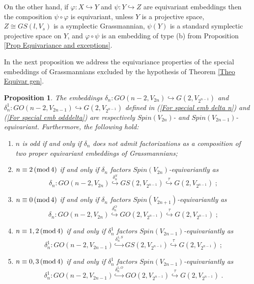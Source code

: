 \documentclass[12pt]{amsart}
\def\hw  {\hookrightarrow}
\newtheorem{prop}[theorem]{Proposition}
\begin{document}
On the other hand, if $\varphi:X\hookrightarrow Y$ and $\psi:Y \hookrightarrow Z$ are equivariant embeddings then the composition $\psi\circ \varphi$ is equivariant, unless $Y$ is a projective space, $Z\cong GS(l,V_s)$ is a symplectic Grassmannian, $\psi(Y)$ is a standard symplectic projective space on $Y$, and $\varphi\circ \psi$ is an embedding of type (b) from Proposition \ref{Prop Equivariance and exceptions}.

In the next proposition we address the equivariance properties of the special embeddings of Grassmannians excluded by the hypothesis of Theorem \ref{Theo Equivar gen}.

\begin{prop}\label{Prop special emb delta 4k2 S 4k O}
The embeddings $\delta_n:GO(n-2,V_{2n})\hw G(2,V_{2^{n-1}})$ and $\delta^1_n:GO(n-2,V_{2n-1})\hw G(2,V_{2^{n-1}})$ defined in (\ref{For special emb delta n}) and (\ref{For special emb odddelta}) are respectively $Spin(V_{2n})$- and $Spin(V_{2n-1})$-equivariant. Furthermore, the following hold:
\begin{enumerate}
\item[{\rm (i)}] $n$ is odd if and only if $\delta_n$ does not admit factorizations as a composition of two proper equivariant embeddings of Grassmannians;
\item[{\rm (ii)}] $n\equiv 2\,({\rm mod}\, 4)$ if and only if $\delta_n$ factors $Spin(V_{2n})$-equivariantly as
$$
\delta_n:GO(n-2,V_{2n})\stackrel{\delta_n^S}{\hw} GS(2,V_{2^{n-1}})\stackrel{\tau}{\hookrightarrow} G(2,V_{2^{n-1}})\;;
$$
\item[{\rm (iii)}] $n\equiv 0\,({\rm mod}\, 4)$ if and only if $\delta_n$ factors $Spin(V_{2n+1})$-equivariantly as
$$
\delta_n:GO(n-2,V_{2n})\stackrel{\delta_n^O}{\hw} GO(2,V_{2^{n-1}})\stackrel{\tau}{\hookrightarrow} G(2,V_{2^{n-1}})\;;
$$
\item[{\rm (iv)}] $n\equiv 1,2\,({\rm mod}\, 4)$ if and only if $\delta^1_n$ factors $Spin(V_{2n-1})$-equivariantly as
$$
\delta^1_n:GO(n-2,V_{2n-1})\stackrel{\delta_n^{1,S}}{\hw} GS(2,V_{2^{n-1}}) \stackrel{\tau}{\hookrightarrow}G(2,V_{2^{n-1}})\;;
$$
\item[{\rm (v)}] $n\equiv 0,3\,({\rm mod}\, 4)$ if and only if $\delta^1_n$ factors $Spin(V_{2n-1})$-equivariantly as 
$$
\delta^1_n:GO(n-2,V_{2n-1})\stackrel{\delta_n^{1,O}}{\hw} GO(2,V_{2^{n-1}}) \stackrel{\tau}{\hookrightarrow}G(2,V_{2^{n-1}})\;.
$$
\end{enumerate}
\end{prop}
\end{document}
